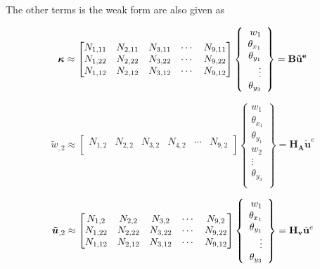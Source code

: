 \documentclass[main.tex]{subfiles}
\begin{document}
The other terms is the weak form are also given as



\begin{equation}\label{eq:kappa_KR}
\boldsymbol{ \kappa }   \approx
\begin{bmatrix}
N_{1,11} & N_{2,11} & N_{3,11} & \cdots & N_{9,11} \\
N_{1,22} & N_{2,22} & N_{3,22} & \cdots & N_{9,22} \\
N_{1,12} & N_{2,12} & N_{3,12} & \cdots & N_{9,12} 
\end{bmatrix} 
\left\{
\begin{array}{r}
w_1 \\
\theta_{x_1} \\
\theta_{y_1} \\
\vdots \\
\theta_{y_{3}} \\
\end{array} \right\}=\mathbf{ B } \mathbf{\tilde{u}^e}
\end{equation}

\begin{equation}\label{eq:axial_KR}
\tilde{w}_{,2}    \approx
\begin{bmatrix}
N_{1,2}  & N_{2,2}  & N_{3,2} & N_{4,2}  & \cdots & N_{9,2} \\
\end{bmatrix} 
\left\{
\begin{array}{r}
w_1 \\
\theta_{x_1} \\
\theta_{y_1} \\
w_{2} \\
\vdots \\
\theta_{y_{3}} \\
\end{array} \right\}=\mathbf{ H_A }\tilde{\mathbf{u}}^e
\end{equation}

\begin{equation}
\boldsymbol{\tilde{u}}_{,2}    \approx 
\begin{bmatrix}
N_{1,2}  & N_{2,2}  & N_{3,2}  & \cdots & N_{9,2} \\
N_{1,22} & N_{2,22} & N_{3,22} & \cdots & N_{9,22} \\
N_{1,12} & N_{2,12} & N_{3,12} & \cdots & N_{9,12} 
\end{bmatrix}
\left\{
\begin{array}{r}
w_1 \\
\theta_{x_1} \\
\theta_{y_1} \\
\vdots \\
\theta_{y_{3}} \\
\end{array} \right\}=\mathbf{ H_v }\tilde{\mathbf{u}}^e
\end{equation}
\end{document}
